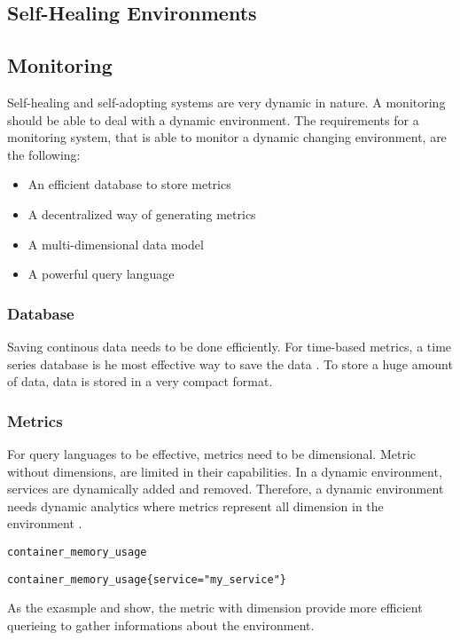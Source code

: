 \subsection{Self-Healing Environments}

\subsection{Monitoring}
Self-healing and self-adopting systems are very dynamic in nature. A monitoring should be able to deal with a dynamic environment.
The requirements for a monitoring system, that is able to monitor a dynamic changing environment, are the following:
\begin{itemize}
\item An efficient database to store metrics
\item A decentralized way of generating metrics \cite{Farcic2017Toolkit21} %
\item A multi-dimensional data model \cite{Farcic2017Toolkit21} %
\item A powerful query language \cite{Farcic2017Toolkit21}
\end{itemize}


\subsubsection{Database}
Saving continous data needs to be done efficiently. 
For time-based metrics, a time series database is he most effective way to save the data \cite{Farcic2017Toolkit21}. To store a huge amount of data, data is stored in a very compact format.


\subsubsection{Metrics}
For query languages to be effective, metrics need to be dimensional. Metric without dimensions, are limited in their capabilities.
In a dynamic environment, services are dynamically added and removed. Therefore, a dynamic environment needs dynamic analytics where metrics represent all dimension in the environment \cite{Farcic2018Toolkit22}.
\begin{lstlisting}[frame=single, label=lst:mon_metr_dimless, caption=Example of a dimensionless-metric, captionpos=b]
container_memory_usage
\end{lstlisting}
\begin{lstlisting}[frame=single, label=lst:mon_metr_withdim, caption=Example of a metric with dimensions, captionpos=b]
container_memory_usage{service="my_service"}
\end{lstlisting}
As the exasmple  and  show, the metric with dimension provide more efficient querieing to gather informations about the environment.


